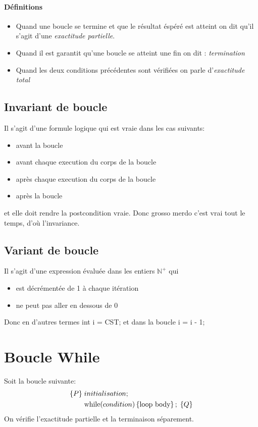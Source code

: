 \documentclass[12pt]{article}
\begin{document}
\paragraph*{Définitions}
\begin{itemize}
    \item Quand une boucle se termine et que le résultat éspéré est 
    atteint on dit qu'il s'agit d'une \emph{exactitude partielle}.
    \item Quand il est garantit qu'une boucle se atteint une fin on 
    dit : \emph{termination}
    \item Quand les deux conditions précédentes sont vérifiées on parle
    d'\emph{exactitude total}
\end{itemize}

\subsection*{Invariant de boucle}
Il s'agit d'une formule logique qui est vraie dans les cas suivants:
\begin{itemize}
    \item avant la boucle
    \item avant chaque execution du corps de la boucle
    \item après chaque execution du corps de la boucle
    \item après la boucle
\end{itemize}
et elle doit rendre la postcondition vraie. Donc grosso merdo c'est vrai
tout le temps, d'où l'invariance.

\subsection*{Variant de boucle}
Il s'agit d'une expression évaluée dans les entiers $\mathbb{N}^{+}$ qui
\begin{itemize}
    \item est décrémentée de 1 à chaque itération
    \item ne peut pas aller en dessous de 0
\end{itemize}
Donc en d'autres termes int i = CST; et dans la boucle i = i - 1;

\section*{Boucle While}
Soit la boucle suivante:
\begin{align*}
    \left\{P\right\}\; &initialisation;\\
    &\textnormal{while}(condition)\left\{\textnormal{loop body}\right\};\; \left\{Q\right\}
\end{align*}
On vérifie l'exactitude partielle et la terminaison séparement.
\end{document}
